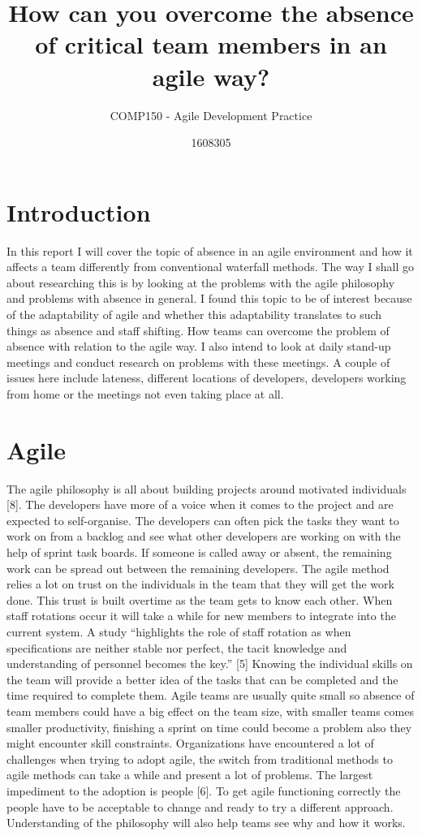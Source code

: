 \documentclass{scrartcl}
\title{How can you overcome the absence of critical team members in an agile way?}
\subtitle{COMP150 - Agile Development Practice}
\author{1608305}
\begin{document}
\maketitle


\section{Introduction}

In this report I will cover the topic of absence in an agile environment and how it affects a team differently from conventional waterfall methods. The way I shall go about researching this is by looking at the problems with the agile philosophy and problems with absence in general. I found this topic to be of interest because of the adaptability of agile and whether this adaptability translates to such things as absence and staff shifting. How teams can overcome the problem of absence with relation to the agile way.  I also intend to look at daily stand-up meetings and conduct research on problems with these meetings. A couple of issues here include lateness, different locations of developers, developers working from home or the meetings not even taking place at all.

\section{Agile}

The agile philosophy is all about building projects around motivated individuals [8]. The developers have more of a voice when it comes to the project and are expected to self-organise. The developers can often pick the tasks they want to work on from a backlog and see what other developers are working on with the help of sprint task boards. If someone is called away or absent, the remaining work can be spread out between the remaining developers. 
The agile method relies a lot on trust on the individuals in the team that they will get the work done. This trust is built overtime as the team gets to know each other. When staff rotations occur it will take a while for new members to integrate into the current system.  A study “highlights the role of staff rotation as when specifications are neither stable nor perfect, the tacit knowledge and understanding of personnel becomes the key.” [5] Knowing the individual skills on the team will provide a better idea of the tasks that can be completed and the time required to complete them. 
Agile teams are usually quite small so absence of team members could have a big effect on the team size, with smaller teams comes smaller productivity, finishing a sprint on time could become a problem also they might encounter skill constraints.
Organizations have encountered a lot of challenges when trying to adopt agile, the switch from traditional methods to agile methods can take a while and present a lot of problems.  The largest impediment to the adoption is people [6]. To get agile functioning correctly the people have to be acceptable to change and ready to try a different approach. Understanding of the philosophy will also help teams see why and how it works. 
\end{document}
